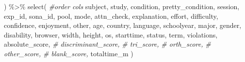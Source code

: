 \documentclass[
]{article}
\newenvironment{Shaded}{\begin{snugshade}}{\end{snugshade}}
\newcommand{\CommentTok}[1]{\textcolor[rgb]{0.56,0.35,0.01}{\textit{#1}}}
\newcommand{\FunctionTok}[1]{\textcolor[rgb]{0.00,0.00,0.00}{#1}}
\newcommand{\NormalTok}[1]{#1}
\newcommand{\SpecialCharTok}[1]{\textcolor[rgb]{0.00,0.00,0.00}{#1}}
\begin{document}
\begin{Shaded}
\begin{Highlighting}[]
\NormalTok{   ) }\SpecialCharTok{\%\textgreater{}\%} \FunctionTok{select}\NormalTok{( }\CommentTok{\#order cols }
\NormalTok{    subject,}
\NormalTok{    study,}
\NormalTok{    condition,}
\NormalTok{    pretty\_condition,}
\NormalTok{    session,}
\NormalTok{    exp\_id,}
\NormalTok{    sona\_id,}
\NormalTok{    pool,}
\NormalTok{    mode,}
\NormalTok{    attn\_check,}
\NormalTok{    explanation,}
\NormalTok{    effort,}
\NormalTok{    difficulty,}
\NormalTok{    confidence,}
\NormalTok{    enjoyment,}
\NormalTok{    other,}
\NormalTok{    age,}
\NormalTok{    country,}
\NormalTok{    language,}
\NormalTok{    schoolyear,}
\NormalTok{    major,}
\NormalTok{    gender,}
\NormalTok{    disability,}
\NormalTok{    browser,}
\NormalTok{    width,}
\NormalTok{    height,}
\NormalTok{    os,}
\NormalTok{    starttime,}
\NormalTok{    status,}
\NormalTok{    term,}
\NormalTok{    violations,}
\NormalTok{    absolute\_score,}
    \CommentTok{\# discriminant\_score,}
    \CommentTok{\# tri\_score,}
    \CommentTok{\# orth\_score,}
    \CommentTok{\# other\_score,}
    \CommentTok{\# blank\_score,}
\NormalTok{    totaltime\_m}
\NormalTok{   )  }
\end{Highlighting}
\end{Shaded}
\end{document}
